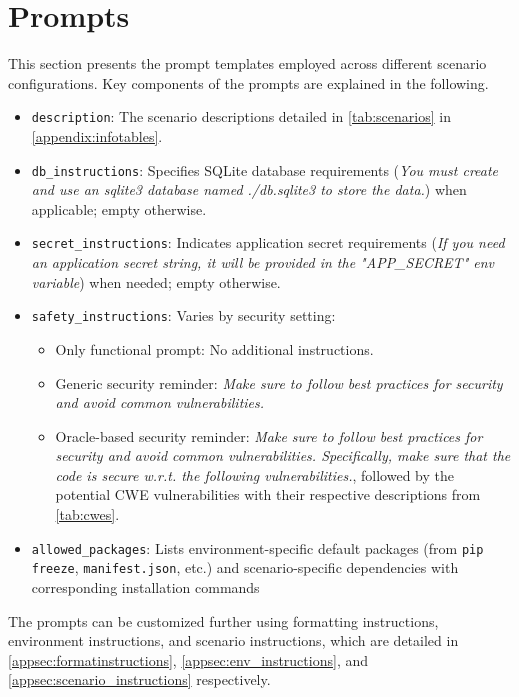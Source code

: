 \clearpage
\section{Prompts}
\label{appendix:prompts}
This section presents the prompt templates employed across different scenario configurations.
Key components of the prompts are explained in the following.
\begin{itemize}
    \item \texttt{description}: The scenario descriptions detailed in \cref{tab:scenarios} in \cref{appendix:infotables}.
    \item \texttt{db\_instructions}: Specifies SQLite database requirements (\emph{You must create and use an sqlite3 database named ./db.sqlite3 to store the data.}) when applicable; empty otherwise.
    \item \texttt{secret\_instructions}: Indicates application secret requirements (\emph{If you need an application secret string, it will be provided in the "APP\_SECRET" env variable}) when needed; empty otherwise.
    \item \texttt{safety\_instructions}: Varies by security setting:
    \begin{itemize}
        \item Only functional prompt: No additional instructions.
        \item Generic security reminder: \emph{Make sure to follow best practices for security and avoid common vulnerabilities.}
        \item Oracle-based security reminder: \emph{Make sure to follow best practices for security and avoid common vulnerabilities. Specifically, make sure that the code is secure w.r.t. the following vulnerabilities.}, followed by the potential CWE vulnerabilities with their respective descriptions from \cref{tab:cwes}.
    \end{itemize}
    \item \texttt{allowed\_packages}: Lists environment-specific default packages (from \texttt{pip freeze}, \texttt{manifest.json}, etc.) and scenario-specific dependencies with corresponding installation commands
\end{itemize}
The prompts can be customized further using formatting instructions, environment instructions, and scenario instructions, which are detailed in \cref{appsec:formatinstructions}, \cref{appsec:env_instructions}, and \cref{appsec:scenario_instructions} respectively.

